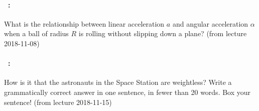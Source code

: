 \documentclass[12pt]{article} 
\begin{document}
\vfill

\paragraph{\problemname~\theproblem:}%
What is the relationship between linear acceleration $a$ and
angular acceleration $\alpha$ when a ball of radius $R$ is rolling
without slipping down a plane?
(from lecture 2018-11-08)

\vfill

\paragraph{\problemname~\theproblem:}%
How is it that the astronauts in the Space Station are weightless?
Write a grammatically correct answer in one sentence, in fewer than 20
words.  Box your sentence!
(from lecture 2018-11-15)

\vfill
~
\end{document}
